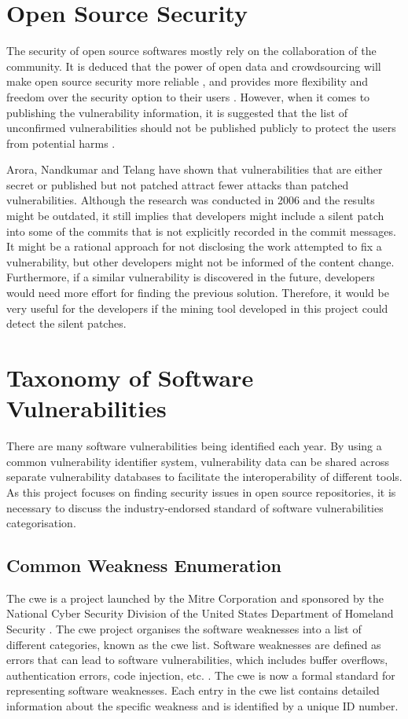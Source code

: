 \documentclass[12pt, a4paper]{report}
\begin{document}
\section{Open Source Security}
The security of open source softwares mostly rely on the collaboration of the community. It is
deduced that the power of open data and crowdsourcing will make open source security more reliable
\cite{hoepman_2007, witten_2001}, and provides more flexibility and freedom over the security option
to their users \cite{payne_2002}. However, when it comes to publishing the vulnerability
information, it is suggested that the list of unconfirmed vulnerabilities should not be published
publicly to protect the users from potential harms \cite{schryen_2011}.

Arora, Nandkumar and Telang \cite{arora_2006} have shown that vulnerabilities that are either secret
or published but not patched attract fewer attacks than patched vulnerabilities. Although the
research was conducted in 2006 and the results might be outdated, it still implies that developers
might include a silent patch into some of the commits that is not explicitly recorded in the commit
messages. It might be a rational approach for not disclosing the work attempted to fix a
vulnerability, but other developers might not be informed of the content change. Furthermore, if a
similar vulnerability is discovered in the future, developers would need more effort for finding the
previous solution. Therefore, it would be very useful for the developers if the mining tool
developed in this project could detect the silent patches.

\section{Taxonomy of Software Vulnerabilities}
There are many software vulnerabilities being identified each year. By using a common vulnerability
identifier system, vulnerability data can be shared across separate vulnerability databases to
facilitate the interoperability of different tools. As this project focuses on finding security
issues in open source repositories, it is necessary to discuss the industry-endorsed standard of
software vulnerabilities categorisation.

\subsection{Common Weakness Enumeration}
The \acrfull{cwe} is a project launched by the Mitre Corporation and sponsored by the National Cyber
Security Division of the United States Department of Homeland Security \cite{cwe}. The
\acrshort{cwe} project organises the software weaknesses into a list of different categories, known
as the \acrshort{cwe} list. Software weaknesses are defined as errors that can lead to software
vulnerabilities, which includes buffer overflows, authentication errors, code injection, etc.
\cite{cwe_faq}. The \acrshort{cwe} is now a formal standard for representing software weaknesses.
Each entry in the \acrshort{cwe} list contains detailed information about the specific weakness and
is identified by a unique ID number.
\end{document}
